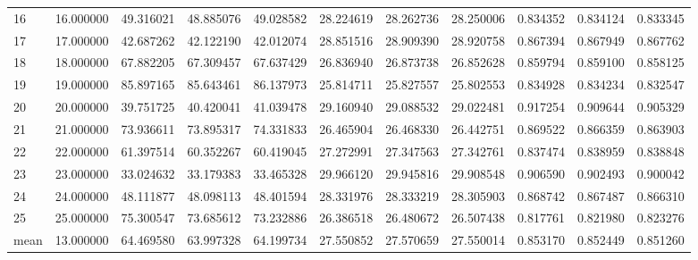 \begin{tabular}{lrrrrrrrrrr}
16 & 16.000000 & 49.316021 & 48.885076 & 49.028582 & 28.224619 & 28.262736 & 28.250006 & 0.834352 & 0.834124 & 0.833345 \\
17 & 17.000000 & 42.687262 & 42.122190 & 42.012074 & 28.851516 & 28.909390 & 28.920758 & 0.867394 & 0.867949 & 0.867762 \\
18 & 18.000000 & 67.882205 & 67.309457 & 67.637429 & 26.836940 & 26.873738 & 26.852628 & 0.859794 & 0.859100 & 0.858125 \\
19 & 19.000000 & 85.897165 & 85.643461 & 86.137973 & 25.814711 & 25.827557 & 25.802553 & 0.834928 & 0.834234 & 0.832547 \\
20 & 20.000000 & 39.751725 & 40.420041 & 41.039478 & 29.160940 & 29.088532 & 29.022481 & 0.917254 & 0.909644 & 0.905329 \\
21 & 21.000000 & 73.936611 & 73.895317 & 74.331833 & 26.465904 & 26.468330 & 26.442751 & 0.869522 & 0.866359 & 0.863903 \\
22 & 22.000000 & 61.397514 & 60.352267 & 60.419045 & 27.272991 & 27.347563 & 27.342761 & 0.837474 & 0.838959 & 0.838848 \\
23 & 23.000000 & 33.024632 & 33.179383 & 33.465328 & 29.966120 & 29.945816 & 29.908548 & 0.906590 & 0.902493 & 0.900042 \\
24 & 24.000000 & 48.111877 & 48.098113 & 48.401594 & 28.331976 & 28.333219 & 28.305903 & 0.868742 & 0.867487 & 0.866310 \\
25 & 25.000000 & 75.300547 & 73.685612 & 73.232886 & 26.386518 & 26.480672 & 26.507438 & 0.817761 & 0.821980 & 0.823276 \\
mean & 13.000000 & 64.469580 & 63.997328 & 64.199734 & 27.550852 & 27.570659 & 27.550014 & 0.853170 & 0.852449 & 0.851260 \\
\end{tabular}

